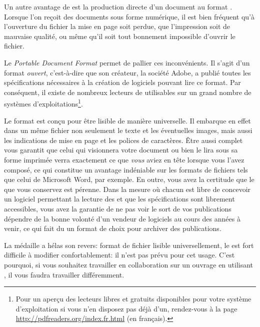 Un autre avantage de \XeLaTeX{} est la production directe d'un document au format . Lorsque l'on reçoit des documents sous forme numérique, il est bien fréquent qu'à l'ouverture du fichier la mise en page soit perdue, que l'impression soit de mauvaise qualité, ou même qu'il soit tout bonnement impossible d'ouvrir le fichier.

Le \emph{Portable Document Format} permet de pallier ces inconvénients. Il s'agit d'un format \emph{ouvert}, c'est-à-dire que son créateur, la société Adobe, a publié toutes les spécifications nécessaires à la création de logiciels pouvant lire ce format. Par conséquent, il existe de nombreux lecteurs de  utilisables sur un grand nombre de systèmes d'exploitations\footnote{Pour un aperçu des lecteurs libres et gratuits disponibles pour votre système d'exploitation si vous n'en disposez pas déjà d'un, rendez-vous à la page \url{http://pdfreaders.org/index.fr.html} (en français).}.

Le format  est conçu pour être lisible de manière universelle. Il embarque en effet dans un même fichier non seulement le texte et les éventuelles images, mais aussi les indications de mise en page et les polices de caractères. Être aussi complet vous garantit que celui qui visionnera votre document ou bien le lira sous sa forme imprimée verra exactement ce que \emph{vous} aviez en tête lorsque vous l'avez composé, ce qui constitue un avantage indéniable sur les formats de fichiers tels que celui de Microsoft Word, par exemple. En outre, vous avez la certitude que le  que vous conservez est pérenne. Dans la mesure où chacun est libre de concevoir un logiciel permettant la lecture des  et que les spécifications sont librement accessibles, vous avez la garantie de ne pas voir le sort de vos publications dépendre de la bonne volonté d'un vendeur de logiciels au cours des années à venir, ce qui fait du  un format de choix pour archiver des publications.

La médaille a hélas son revers: format de fichier lisible universellement, le  est fort difficile à modifier confortablement: il n'est pas prévu pour cet usage. C'est pourquoi, si vous souhaitez travailler en collaboration sur un ouvrage en utilisant \XeLaTeX{}, il vous faudra travailler différemment.